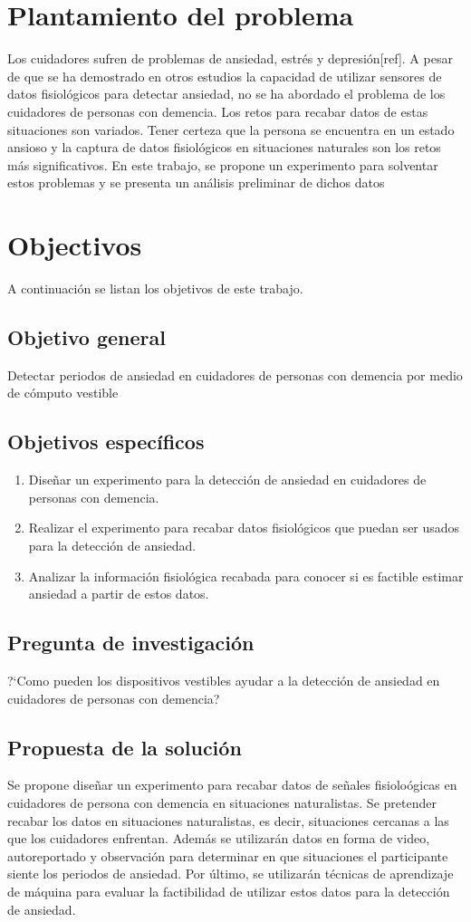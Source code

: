 \section{Plantamiento del problema}
Los cuidadores sufren de problemas de ansiedad, estr\'es y depresi\'on[ref]. A pesar de que se ha demostrado en otros estudios la capacidad de utilizar sensores de datos fisiol\'ogicos para detectar ansiedad, no se ha abordado el problema de los cuidadores de personas con demencia. Los retos para recabar datos de estas situaciones son variados. Tener certeza que la persona se encuentra en un estado ansioso y la captura de datos fisiol\'ogicos en situaciones naturales son los retos m\'as significativos. En este trabajo, se propone un experimento para solventar estos problemas y se presenta un an\'alisis preliminar de dichos datos
\section{Objectivos}
	A continuaci\'on se listan los objetivos de este trabajo.
\subsection{Objetivo general}
	Detectar periodos de ansiedad en cuidadores de personas con demencia por medio de c\'omputo vestible
\subsection{Objetivos espec\'ificos}
	\begin{enumerate}
		\item Dise\~nar un experimento para la detecci\'on de ansiedad en cuidadores de personas con demencia.
		\item Realizar el experimento para recabar datos fisiol\'ogicos que puedan ser usados para la detecci\'on de ansiedad.
		\item Analizar la informaci\'on fisiol\'ogica recabada para conocer si es factible estimar ansiedad a partir de estos datos.
	\end{enumerate}
\subsection{Pregunta de investigaci\'on}
	?`Como pueden los dispositivos vestibles ayudar a la detecci\'on de ansiedad en cuidadores de personas con demencia?
\subsection{Propuesta de la soluci\'on}
	Se propone dise\~nar un experimento para recabar datos de se\~nales fisiolo\'ogicas en cuidadores de persona con demencia en situaciones naturalistas. Se pretender recabar los datos en situaciones naturalistas, es decir, situaciones cercanas a las que los cuidadores enfrentan. Adem\'as se utilizar\'an datos en forma de video, autoreportado y observaci\'on para determinar en que situaciones el participante siente los periodos de ansiedad. Por \'ultimo, se utilizar\'an t\'ecnicas de aprendizaje de m\'aquina para evaluar la factibilidad de utilizar estos datos para la detecci\'on de ansiedad.

